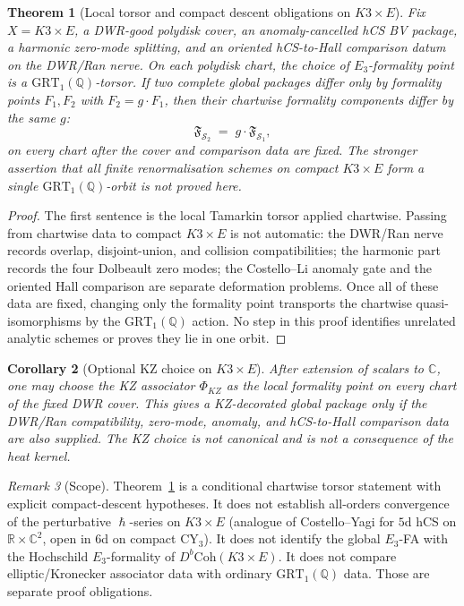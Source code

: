\documentclass[11pt]{amsart}
\theoremstyle{plain}
\newtheorem{theorem}{Theorem}[section]
\newtheorem{corollary}[theorem]{Corollary}
\theoremstyle{definition}
\theoremstyle{remark}
\newtheorem{remark}[theorem]{Remark}
\providecommand{\C}{\mathbb{C}}
\providecommand{\Q}{\mathbb{Q}}
\providecommand{\R}{\mathbb{R}}
\providecommand{\GRT}{\mathrm{GRT}}
\providecommand{\hbar}{\hslash}
\begin{document}
\begin{theorem}[Local torsor and compact descent obligations on $K3 \times E$]
\label{thm:k3xe-grt1-orbit}
Fix $X=K3\times E$, a DWR-good polydisk cover, an anomaly-cancelled
hCS BV package, a harmonic zero-mode splitting, and an oriented
hCS-to-Hall comparison datum on the DWR/Ran nerve. On each polydisk
chart, the choice of $E_3$-formality point is a $\GRT_1(\Q)$-torsor.
If two complete global packages differ only by formality points
$F_1,F_2$ with $F_2=g\cdot F_1$, then their chartwise formality
components differ by the same $g$:
\[
  \mathfrak{F}_{\mathcal{S}_2} \;=\; g \cdot \mathfrak{F}_{\mathcal{S}_1} ,
\]
on every chart after the cover and comparison data are fixed. The
stronger assertion that all finite renormalisation schemes on compact
$K3\times E$ form a single $\GRT_1(\Q)$-orbit is not proved here.
\end{theorem}

\begin{proof}
The first sentence is the local Tamarkin torsor applied chartwise.
Passing from chartwise data to compact $K3\times E$ is not automatic:
the DWR/Ran nerve records overlap, disjoint-union, and collision
compatibilities; the harmonic part records the four Dolbeault zero
modes; the Costello--Li anomaly gate and the oriented Hall comparison
are separate deformation problems. Once all of these data are fixed,
changing only the formality point transports the chartwise
quasi-isomorphisms by the $\GRT_1(\Q)$ action. No step in this proof
identifies unrelated analytic schemes or proves they lie in one orbit.
\end{proof}

\begin{corollary}[Optional KZ choice on $K3 \times E$]
\label{cor:phi-kz-on-k3xe}
After extension of scalars to $\C$, one may choose the KZ associator
$\Phi_{KZ}$ as the local formality point on every chart of the fixed
DWR cover. This gives a KZ-decorated global package only if the DWR/Ran
compatibility, zero-mode, anomaly, and hCS-to-Hall comparison data are
also supplied. The KZ choice is not canonical and is not a consequence
of the heat kernel.
\end{corollary}

\begin{remark}[Scope]
\label{rem:scope}
Theorem~\ref{thm:k3xe-grt1-orbit} is a conditional chartwise torsor
statement with explicit compact-descent hypotheses. It does not
establish all-orders convergence of the perturbative $\hbar$-series on
$K3 \times E$ \textup{(}analogue of Costello--Yagi for $5$d hCS on
$\R \times \C^2$, open in $6$d on compact CY$_3$\textup{).} It does
not identify the global $E_3$-FA with the Hochschild $E_3$-formality of
$D^b\mathrm{Coh}(K3 \times E)$. It does not compare elliptic/Kronecker
associator data with ordinary $\GRT_1(\Q)$ data. Those are separate
proof obligations.
\end{remark}
\end{document}
